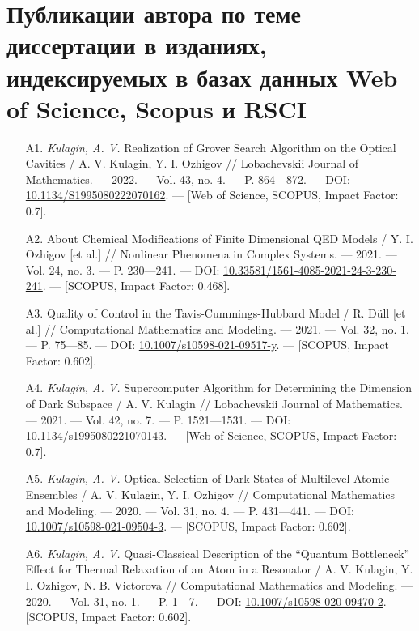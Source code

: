 \clearpage

\chapter*{
	Публикации автора по теме диссертации в изданиях, индексируемых в базах данных Web of Science, Scopus и RSCI
}
\vspace{-1em}
\hypersetup{urlcolor=blue}
{\seminormalsize
\begin{itemize}[leftmargin=24pt]
	\item[A1.]{\textit{Kulagin, A. V.} Realization of Grover Search Algorithm on the Opti­cal Cavities / A. V. Kulagin, Y. I. Ozhigov // Lobachevskii Journal of Mathematics. — 2022. — Vol. 43, no. 4. — P. 864—872. — DOI: \href{https://doi.org/10.1134/S1995080222070162}{10.1134/S1995080222070162}. — [Web of Science, SCOPUS, Impact Factor: 0.7].}
	\item[A2.]{About Chemical Modifications of Finite Dimensional QED Models / Y. I. Ozhigov [et al.] // Nonlinear Phenomena in Complex Systems. — 2021. — Vol. 24, no. 3. — P. 230—241. — DOI: \href{https://doi.org/10.33581/1561-4085-2021-24-3-230-241}{10.33581/1561-4085-2021-24-3-230-241}. — [SCOPUS, Impact Factor: 0.468].}
	\item[A3.]{Quality of Control in the Tavis-Cummings-Hubbard Model / R. Düll [et al.] // Computational Mathematics and Modeling. — 2021. — Vol. 32, no. 1. — P. 75—85. — DOI: \href{https://doi.org/10.1007/s10598-021-09517-y}{10.1007/s10598-021-09517-y}. — [SCOPUS, Impact Factor: 0.602].}
	\item[A4.]{\textit{Kulagin, A. V.} Supercomputer Algorithm for Determining the Dimension of Dark Subspace / A. V. Kulagin // Lobachevskii Journal of Mathemat­ics. — 2021. — Vol. 42, no. 7. — P. 1521—1531. — DOI: \href{https://doi.org/10.1134/s1995080221070143}{10.1134/s1995080221070143}. — [Web of Science, SCOPUS, Impact Factor: 0.7].}
	\item[A5.]{\textit{Kulagin, A. V.} Optical Selection of Dark States of Multilevel Atomic Ensembles / A. V. Kulagin, Y. I. Ozhigov // Computational Mathematics and Modeling. — 2020. — Vol. 31, no. 4. — P. 431—441. — DOI: \href{https://doi.org/10.1007/s10598-021-09504-3}{10.1007/s10598-021-09504-3}. — [SCOPUS, Impact Factor: 0.602].}
	\item[A6.]{\textit{Kulagin, A. V.} Quasi-Classical Description of the ``Quantum Bottleneck'' Effect for Thermal Relaxation of an Atom in a Resonator / A. V. Kulagin, Y. I. Ozhigov, N. B. Victorova // Computational Mathematics and Mod­eling. — 2020. — Vol. 31, no. 1. — P. 1—7. — DOI: \href{https://doi.org/10.1007/s10598-020-09470-2}{10.1007/s10598-020-09470-2}. — [SCOPUS, Impact Factor: 0.602].}

\end{itemize}}
